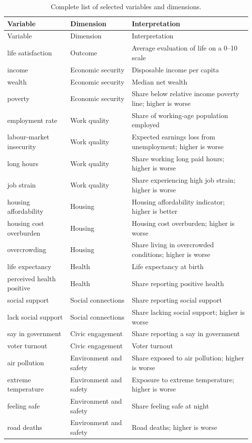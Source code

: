 \documentclass[11pt,a4paper]{article}
\begin{document}
\begin{longtable}{p{}p{}p{}}
\caption{Complete list of selected variables and dimensions.}\label{tab:appendixvars}\\
\toprule
Variable & Dimension & Interpretation \\
\midrule
\endfirsthead
\toprule
Variable & Dimension & Interpretation \\
\midrule
\endhead
life satisfaction & Outcome & Average evaluation of life on a 0--10 scale \\
income & Economic security & Disposable income per capita \\
wealth & Economic security & Median net wealth \\
poverty & Economic security & Share below relative income poverty line; higher is worse \\
employment rate & Work quality & Share of working-age population employed \\
labour-market insecurity & Work quality & Expected earnings loss from unemployment; higher is worse \\
long hours & Work quality & Share working long paid hours; higher is worse \\
job strain & Work quality & Share experiencing high job strain; higher is worse \\
housing affordability & Housing & Housing affordability indicator; higher is better \\
housing cost overburden & Housing & Housing cost overburden; higher is worse \\
overcrowding & Housing & Share living in overcrowded conditions; higher is worse \\
life expectancy & Health & Life expectancy at birth \\
perceived health positive & Health & Share reporting positive health \\
social support & Social connections & Share reporting social support \\
lack social support & Social connections & Share lacking social support; higher is worse \\
say in government & Civic engagement & Share reporting a say in government \\
voter turnout & Civic engagement & Voter turnout \\
air pollution & Environment and safety & Share exposed to air pollution; higher is worse \\
extreme temperature & Environment and safety & Exposure to extreme temperature; higher is worse \\
feeling safe & Environment and safety & Share feeling safe at night \\
road deaths & Environment and safety & Road deaths; higher is worse \\
\bottomrule
\end{longtable}
\end{document}
